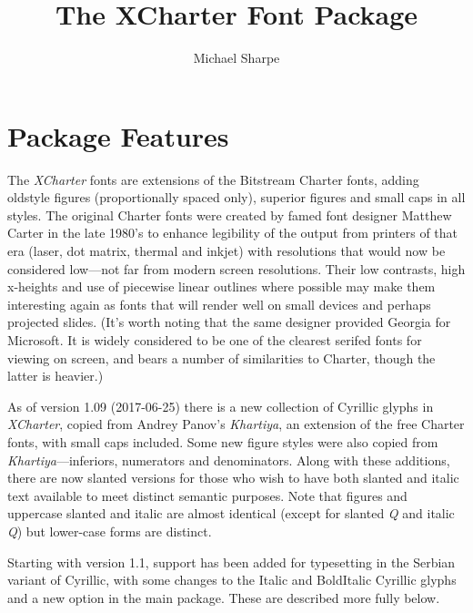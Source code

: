 \documentclass[11pt]{article}
\title{The XCharter Font Package}
\author{Michael Sharpe}
\begin{document}
\maketitle
\traceon{}\traceoff
\section{Package Features}
The \emph{XCharter} fonts are extensions of the Bitstream Charter fonts, adding oldstyle figures (proportionally spaced only), superior figures and small caps in all styles. The original Charter fonts were created by famed font designer Matthew Carter in the late 1980's to enhance legibility of the output from printers of that era (laser, dot matrix, thermal and inkjet) with resolutions that would now be considered low---not far from modern screen resolutions. Their low contrasts, high x-heights and use of piecewise linear outlines where possible may make them interesting again as fonts that will render well on small devices and perhaps projected slides. (It's worth noting that the same designer provided Georgia for Microsoft. It is widely considered to be one of the clearest serifed fonts for viewing on screen, and bears a number of similarities to Charter, though the latter is  heavier.) 

As of version 1.09 (2017-06-25) there is a new collection of Cyrillic glyphs in \emph{XCharter}, copied from Andrey Panov's \emph{Khartiya}, an extension of the free Charter fonts, with small caps included. Some new figure styles were also copied from \emph{Khartiya}---inferiors, numerators and denominators. Along with these additions, there are now slanted versions for those who wish to have both slanted and italic text available to meet distinct semantic purposes. Note that figures and uppercase slanted and italic are almost identical (except for slanted \textsl{Q} and italic \textit{Q}) but lower-case forms are distinct.

Starting with version 1.1, support has been added for typesetting in the Serbian variant of Cyrillic, with some changes to the Italic and BoldItalic Cyrillic glyphs and a new option in the main package. These are described more fully below.
\end{document}
